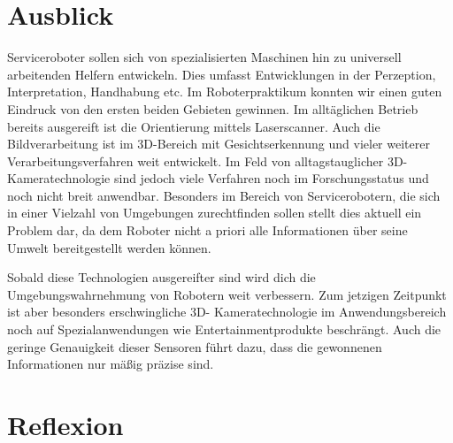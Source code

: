 \section{Ausblick}
Serviceroboter sollen sich von spezialisierten Maschinen hin zu universell arbeitenden Helfern entwickeln.
 Dies umfasst Entwicklungen in der Perzeption, Interpretation, Handhabung etc. Im Roboterpraktikum konnten wir einen guten Eindruck von den ersten beiden Gebieten gewinnen.
 Im alltäglichen Betrieb bereits ausgereift ist die Orientierung mittels
 Laserscanner. Auch die Bildverarbeitung ist im 3D-Bereich mit Gesichtserkennung
 und vieler weiterer Verarbeitungsverfahren weit entwickelt. Im Feld von alltagstauglicher 3D- Kameratechnologie sind jedoch viele Verfahren noch im Forschungsstatus
 und noch nicht breit anwendbar. Besonders im Bereich von Servicerobotern, die sich in einer Vielzahl von Umgebungen zurechtfinden sollen stellt dies aktuell ein Problem dar,
 da dem Roboter nicht a priori alle Informationen über seine Umwelt bereitgestellt werden können.
 
Sobald diese Technologien ausgereifter sind wird dich die Umgebungswahrnehmung von Robotern weit verbessern.
 Zum jetzigen Zeitpunkt ist aber besonders erschwingliche 3D- Kameratechnologie im Anwendungsbereich noch auf Spezialanwendungen wie Entertainmentprodukte beschrängt.
 Auch die geringe Genauigkeit dieser Sensoren führt dazu, dass die gewonnenen Informationen nur mäßig präzise sind.

\section{Reflexion}
\authorsection{\editorandreas}
